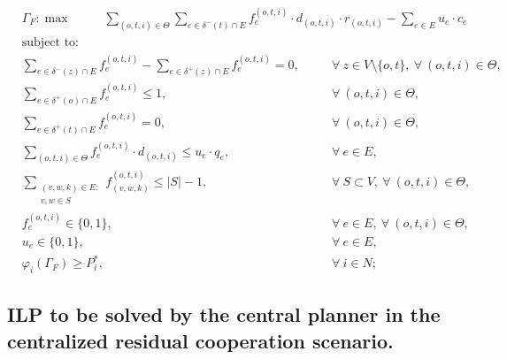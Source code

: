 \documentclass[review]{elsarticle}
\begin{document}
    \begin{align}
        &  \Gamma_F: \max  & \hspace{22pt} \sum_{(o,t,i)\in \Theta} \sum_{e \in \delta^-(t)\cap E}  f_e^{(o,t,i)} \cdot d_{(o,t,i)} \cdot r_{(o,t,i)} - \sum_{e\in E} u_{e}\cdot c_{e} \hspace{40pt} && 
    \end{align}
    \begin{align}
        & \text{subject to:}       && \nonumber \\
        & \sum_{e \in \delta^-(z)\cap E} f_e^{(o,t,i)} -\sum_{e \in \delta^+(z)\cap E} f_{e}^{(o,t,i)} = 0,\quad && \forall\ z\in V\setminus\{o,t\},\ \forall\ (o,t,i)\in\Theta, \\
& \sum_{e \in \delta^+(o)\cap E} f_e^{(o,t,i)} \leq 1, && \forall\ (o,t,i)\in \Theta, \\
 & \sum_{e \in \delta^+(t)\cap E} f_e^{(o,t,i)} = 0,  && \forall\ (o,t,i)\in \Theta,  \\
& \sum_{(o,t,i) \in \Theta} f_e^{(o,t,i)}\cdot d_{(o,t,i)}  \leq u_e\cdot q_e, && \forall\ e \in E,   \\
 & \sum_{\substack{(v,w,k) \in E\colon \\ v,w \in S}} f_{(v,w,k)}^{(o,t,i)} \leq |S| -1, && \forall\ S \subset V,\ \forall\ (o,t,i) \in \Theta,\\
& f_e^{(o,t,i)} \in \{0,1\},  && \forall\ e \in E,\ \forall\ (o,t,i) \in \Theta,  \\
&  u_e  \in \{0,1\},  && \forall\ e \in E, \\
& \varphi_i(\Gamma_F) \geq P_i^*,  && \forall\ i\in N; 
    \end{align}

\subsection{ILP to be solved by the central planner in the centralized residual cooperation scenario.}
\end{document}
